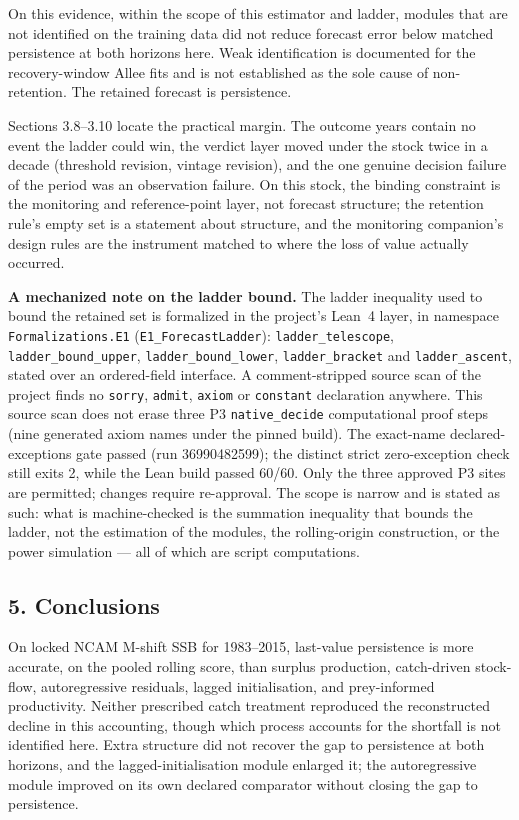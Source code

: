 \documentclass[11pt]{article}
\begin{document}
On this evidence, within the scope of this estimator and ladder, modules
that are not identified on the training data did not reduce forecast
error below matched persistence at both horizons here. Weak
identification is documented for the recovery-window Allee fits and is
not established as the sole cause of non-retention. The retained
forecast is persistence.

Sections 3.8--3.10 locate the practical margin. The outcome years contain
no event the ladder could win, the verdict layer moved under the stock
twice in a decade (threshold revision, vintage revision), and the one
genuine decision failure of the period was an observation failure. On
this stock, the binding constraint is the monitoring and reference-point
layer, not forecast structure; the retention rule's empty set is a
statement about structure, and the monitoring companion's design rules
are the instrument matched to where the loss of value actually occurred.

\noindent\textbf{A mechanized note on the ladder bound.} The ladder inequality used to bound
the retained set is formalized in the project's Lean~4 layer, in namespace
\texttt{Formalizations.E1} (\texttt{E1\_ForecastLadder}): \texttt{ladder\_telescope},
\texttt{ladder\_bound\_upper}, \texttt{ladder\_bound\_lower}, \texttt{ladder\_bracket} and
\texttt{ladder\_ascent}, stated over an ordered-field interface. A comment-stripped source
scan of the project finds no \texttt{sorry}, \texttt{admit}, \texttt{axiom} or
\texttt{constant} declaration anywhere. This source scan does not erase three P3
\texttt{native\_decide} computational proof steps (nine generated
axiom names under the pinned build). The exact-name declared-exceptions gate passed (run 36990482599); the distinct strict zero-exception check still exits 2, while the Lean build passed 60/60. Only the three approved P3 sites are permitted; changes require re-approval. The scope is narrow and is stated as such: what is
machine-checked is the summation inequality that bounds the ladder, not the estimation of the
modules, the rolling-origin construction, or the power simulation --- all of which are script
computations.

\subsection{5. Conclusions}\label{cod-conclusions}

On locked NCAM M-shift SSB for 1983--2015, last-value persistence is
more accurate, on the pooled rolling score, than surplus production,
catch-driven stock-flow, autoregressive residuals, lagged
initialisation, and prey-informed productivity. Neither prescribed catch
treatment reproduced the reconstructed decline in this accounting,
though which process accounts for the shortfall is not identified here. Extra structure did
not recover the gap to persistence at both horizons, and the
lagged-initialisation module enlarged it; the autoregressive module
improved on its own declared comparator without closing the gap
to persistence.
\end{document}
